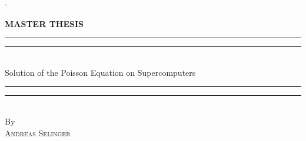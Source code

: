 %
%
% 
%
%
\begin{titlingpage}
\begin{SingleSpace}
\calccentering{\unitlength} 
\begin{adjustwidth*}{\unitlength}{-\unitlength}
\vspace*{13mm}
\begin{center}
{\Large \textbf{MASTER THESIS}}\\[4mm]
\vspace*{15mm}
\rule[0.5ex]{\linewidth}{2pt}\vspace*{-\baselineskip}\vspace*{3.2pt}
\rule[0.5ex]{\linewidth}{1pt}\\[\baselineskip]
{\HUGE Solution of the Poisson Equation on Supercomputers}\\[4mm]
\rule[0.5ex]{\linewidth}{1pt}\vspace*{-\baselineskip}\vspace{3.2pt}
\rule[0.5ex]{\linewidth}{2pt}\\
\vspace{6.5mm}
{\large By}\\
\vspace{6.5mm}
{\large\textsc{Andreas Selinger}}\\
\vspace{11mm}

\end{center}
\end{adjustwidth*}
\end{SingleSpace}
\end{titlingpage}
